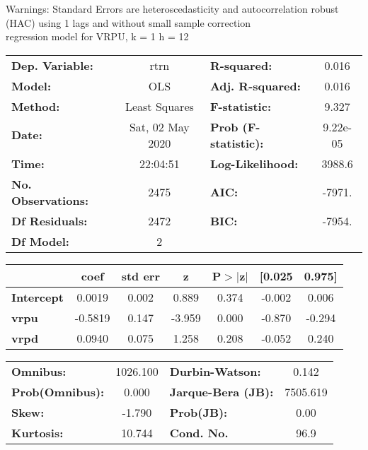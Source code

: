 Warnings: \newline
 [1] Standard Errors are heteroscedasticity and autocorrelation robust (HAC) using 1 lags and without small sample correction\\ 

regression model for VRPU, k = 1 h = 12\begin{center}
\begin{tabular}{lclc}
\toprule
\textbf{Dep. Variable:}    &       rtrn       & \textbf{  R-squared:         } &     0.016   \\
\textbf{Model:}            &       OLS        & \textbf{  Adj. R-squared:    } &     0.016   \\
\textbf{Method:}           &  Least Squares   & \textbf{  F-statistic:       } &     9.327   \\
\textbf{Date:}             & Sat, 02 May 2020 & \textbf{  Prob (F-statistic):} &  9.22e-05   \\
\textbf{Time:}             &     22:04:51     & \textbf{  Log-Likelihood:    } &    3988.6   \\
\textbf{No. Observations:} &        2475      & \textbf{  AIC:               } &    -7971.   \\
\textbf{Df Residuals:}     &        2472      & \textbf{  BIC:               } &    -7954.   \\
\textbf{Df Model:}         &           2      & \textbf{                     } &             \\
\bottomrule
\end{tabular}
\begin{tabular}{lcccccc}
                   & \textbf{coef} & \textbf{std err} & \textbf{z} & \textbf{P$> |$z$|$} & \textbf{[0.025} & \textbf{0.975]}  \\
\midrule
\textbf{Intercept} &       0.0019  &        0.002     &     0.889  &         0.374        &       -0.002    &        0.006     \\
\textbf{vrpu}      &      -0.5819  &        0.147     &    -3.959  &         0.000        &       -0.870    &       -0.294     \\
\textbf{vrpd}      &       0.0940  &        0.075     &     1.258  &         0.208        &       -0.052    &        0.240     \\
\bottomrule
\end{tabular}
\begin{tabular}{lclc}
\textbf{Omnibus:}       & 1026.100 & \textbf{  Durbin-Watson:     } &    0.142  \\
\textbf{Prob(Omnibus):} &   0.000  & \textbf{  Jarque-Bera (JB):  } & 7505.619  \\
\textbf{Skew:}          &  -1.790  & \textbf{  Prob(JB):          } &     0.00  \\
\textbf{Kurtosis:}      &  10.744  & \textbf{  Cond. No.          } &     96.9  \\
\bottomrule
\end{tabular}
\end{center}

